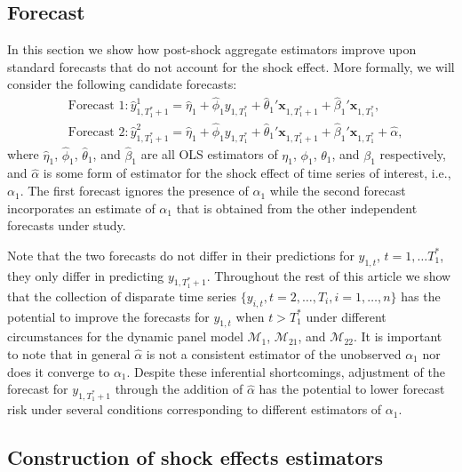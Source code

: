 \documentclass[11pt]{article}
\newcommand{\x}{\textbf{x}}
\def\mc#1{\mathcal{#1}} %
\def\E#1{\mathrm{E}(#1)} %
\theoremstyle{definition}
\begin{document}
\subsection{Forecast}
\label{forecast}
In this section we show how post-shock aggregate estimators improve upon standard 
forecasts that do not account for the shock effect.
More formally, we will consider the following candidate forecasts: 
\begin{align*}
  &\text{Forecast 1}: \hat y_{1,T_1^*+1}^1 = \hat\eta_1 
    + \hat\phi_1 y_{1,T_1^*} + \hat\theta_1'\x_{1,T_1^*+1} 
    + \hat\beta_1'\x_{1,T_1^*}, \\
  &\text{Forecast 2}: \hat y_{1,T_1^*+1}^2 = \hat\eta_1 
    + \hat\phi_1 y_{1,T_1^*} + \hat\theta_1'\x_{1,T_1^*+1} 
    + \hat\beta_1'\x_{1,T_1^*} + \hat{\alpha},
\end{align*}
where $\hat\eta_1$, $\hat\phi_1$, $\hat\theta_1$, and $\hat\beta_1$ are all 
OLS estimators of $\eta_1$, $\phi_1$, $\theta_1$, and $\beta_1$ respectively, 
and $\hat{\alpha}$ is some form of estimator for the shock effect of time series of interest, i.e., $\alpha_1$. 
The first forecast ignores the presence of $\alpha_1$ while the second forecast 
incorporates an estimate of $\alpha_1$ that is obtained from the other independent forecasts under study. 

Note that the two forecasts do not differ in their predictions for 
$y_{1,t}$, $t = 1,\ldots T_1^*$, they only differ in predicting 
$y_{1,T_1^*+1}$. Throughout the rest of this article we show that the collection of 
disparate time series $\{y_{i,t}, t = 2,\ldots,T_i, i = 1,\ldots,n\}$ has 
the potential to improve the forecasts for $y_{1, t}$ when $t > T_1^*$ under different 
circumstances for the dynamic panel model $\mc{M}_1$, $\mc{M}_{21}$, and $\mc{M}_{22}$. 
It is important to note that in general $\hat{\alpha}$ 
is not a consistent estimator of the unobserved $\alpha_1$ nor does it converge 
to $\alpha_1$.  Despite these inferential shortcomings, adjustment of the forecast 
for $y_{1,T_1^*+1}$ through the addition of $\hat{\alpha}$ has 
the potential to lower forecast risk under several conditions corresponding to 
different estimators of $\alpha_1$. %


\subsection{Construction of shock effects estimators}
\label{constructionofestimators}
\end{document}
